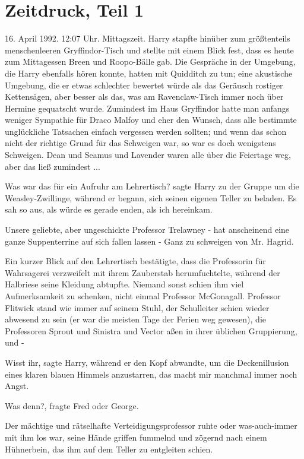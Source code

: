 \chapter{Zeitdruck, Teil 1}

16. April 1992. 12:07 Uhr. Mittagszeit. Harry stapfte hinüber zum größtenteils
menschenleeren Gryffindor-Tisch und stellte mit einem Blick fest, dass es heute
zum Mittagessen Breen und Roopo-Bälle gab. Die Gespräche in der Umgebung, die
Harry ebenfalls hören konnte, hatten mit Quidditch zu tun; eine akustische
Umgebung, die er etwas schlechter bewertet würde als das Geräusch rostiger
Kettensägen, aber besser als das, was am Ravenclaw-Tisch immer noch über Hermine
gequatscht wurde. Zumindest im Haus Gryffindor hatte man anfangs weniger
Sympathie für Draco Malfoy und eher den Wunsch, dass alle bestimmte unglückliche
Tatsachen einfach vergessen werden sollten; und wenn das schon nicht der
richtige Grund für das Schweigen war, so war es doch wenigstens Schweigen. Dean
und Seamus und Lavender waren alle über die Feiertage weg, aber das ließ
zumindest ...

\glqq{}Was war das für ein Aufruhr am Lehrertisch?\grqq{} sagte Harry zu der
Gruppe um die Weasley-Zwillinge, während er begann, sich seinen eigenen Teller
zu beladen. \glqq{}Es sah so aus, als würde es gerade enden, als ich
hereinkam.\grqq{}

\glqq{}Unsere geliebte, aber ungeschickte Professor Trelawney -\grqq{} \glqq{}hat
anscheinend eine ganze Suppenterrine auf sich fallen lassen -\grqq{} \glqq{}Ganz
zu schweigen von Mr. Hagrid.\grqq{}

Ein kurzer Blick auf den Lehrertisch bestätigte, dass die Professorin für
Wahrsagerei verzweifelt mit ihrem Zauberstab herumfuchtelte, während der
Halbriese seine Kleidung abtupfte. Niemand sonst schien ihm viel Aufmerksamkeit
zu schenken, nicht einmal Professor McGonagall. Professor Flitwick stand wie
immer auf seinem Stuhl, der Schulleiter schien wieder abwesend zu sein (er war
die meisten Tage der Ferien weg gewesen), die Professoren Sprout und Sinistra
und Vector aßen in ihrer üblichen Gruppierung, und -

\glqq{}Wisst ihr\grqq{}, sagte Harry, während er den Kopf abwandte, um die
Deckenillusion eines klaren blauen Himmels anzustarren, \glqq{}das macht mir
manchmal immer noch Angst.\grqq{}

\glqq{}Was denn?\grqq{}, fragte Fred oder George.

Der mächtige und rätselhafte Verteidigungsprofessor \glqq{}ruhte\grqq{} oder
was-auch-immer mit ihm los war, seine Hände griffen fummelnd und zögernd nach
einem Hühnerbein, das ihm auf dem Teller zu entgleiten schien.

